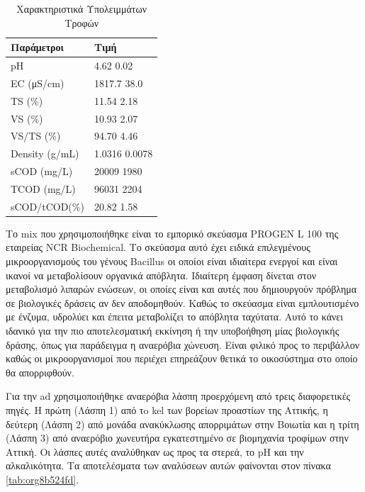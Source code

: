\documentclass[11pt]{report}
\begin{document}
\begin{table}[htbp]
\caption{\label{tab:orgabd8aa5}Χαρακτηριστικά Υπολειμμάτων Τροφών}
\centering
\begin{tabular}{ll}
Παράμετροι & Τιμή\\[0pt]
\hline
pH & 4.62 \textpm{} 0.02\\[0pt]
EC (μS/cm) & 1817.7 \textpm{} 38.0\\[0pt]
TS (\%) & 11.54 \textpm{} 2.18\\[0pt]
VS (\%) & 10.93 \textpm{} 2.07\\[0pt]
VS/TS (\%) & 94.70 \textpm{} 4.46\\[0pt]
Density (g/mL) & 1.0316 \textpm{} 0.0078\\[0pt]
sCOD (mg/L) & 20009 \textpm{} 1980\\[0pt]
TCOD (mg/L) & 96031 \textpm{} 2204\\[0pt]
sCOD/tCOD(\%) & 20.82 \textpm{} 1.58\\[0pt]
\end{tabular}
\end{table}

Το \acrfull{mix} που χρησιμοποιήθηκε είναι το εμπορικό σκεύασμα PROGEN L 100 της εταιρείας NCR Biochemical. Το σκεύασμα αυτό έχει ειδικά επιλεγμένους μικροοργανισμούς του γένους Bacillus οι οποίοι είναι ιδιαίτερα ενεργοί και είναι ικανοί να μεταβολίσουν οργανικά απόβλητα. Ιδιαίτερη έμφαση δίνεται στον μεταβολισμό λιπαρών ενώσεων, οι οποίες είναι και αυτές που δημιουργούν πρόβλημα σε βιολογικές δράσεις αν δεν αποδομηθούν. Καθώς το σκεύασμα είναι εμπλουτισμένο με ένζυμα, υδρολύει και έπειτα μεταβολίζει το απόβλητα ταχύτατα. Αυτό το κάνει ιδανικό για την πιο αποτελεσματική εκκίνηση ή την υποβοήθηση μίας βιολογικής δράσης, όπως για παράδειγμα η αναερόβια χώνευση. Είναι φιλικό προς το περιβάλλον καθώς οι μικροοργανισμοί που περιέχει επηρεάζουν θετικά το οικοσύστημα στο οποίο θα απορριφθούν.

Για την \acrshort{ad} χρησιμοποιήθηκε αναερόβια λάσπη προερχόμενη από τρεις διαφορετικές πηγές. Η πρώτη (Λάσπη 1) από τo \acrfull{kel} των βορείων προαστίων της Αττικής, η δεύτερη (Λάσπη 2) από μονάδα ανακύκλωσης απορριμάτων στην Βοιωτία και η τρίτη (Λάσπη 3) από αναερόβιο χωνευτήρα εγκατεστημένο σε βιομηχανία τροφίμων στην Αττική. Οι λάσπες αυτές αναλύθηκαν ως προς τα στερεά, το pH και την αλκαλικότητα. Τα αποτελέσματα των αναλύσεων αυτών φαίνονται στον πίνακα \ref{tab:org8b524fd}. 
\end{document}
